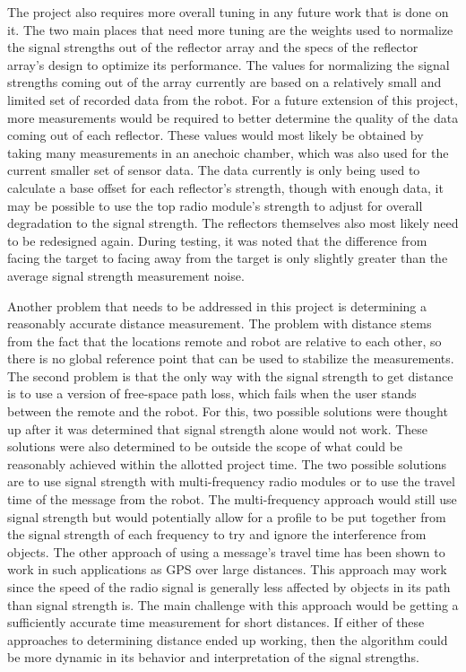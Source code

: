 \vspace*{12pt}
\noindent
The project also requires more overall tuning in any future work that is done on it. The two main places that need more tuning are the weights used to normalize the signal strengths out of the reflector array and the specs of the reflector array's design to optimize its performance. The values for normalizing the signal strengths coming out of the array currently are based on a relatively small and limited set of recorded data from the robot. For a future extension of this project, more measurements would be required to better determine the quality of the data coming out of each reflector. These values would most likely be obtained by taking many measurements in an anechoic chamber, which was also used for the current smaller set of sensor data. The data currently is only being used to calculate a base offset for each reflector's strength, though with enough data, it may be possible to use the top radio module's strength to adjust for overall degradation to the signal strength. The reflectors themselves also most likely need to be redesigned again. During testing, it was noted that the difference from facing the target to facing away from the target is only slightly greater than the average signal strength measurement noise.

\vspace*{12pt}
\noindent
Another problem that needs to be addressed in this project is determining a reasonably accurate distance measurement. The problem with distance stems from the fact that the locations remote and robot are relative to each other, so there is no global reference point that can be used to stabilize the measurements. The second problem is that the only way with the signal strength to get distance is to use a version of free-space path loss, which fails when the user stands between the remote and the robot. For this, two possible solutions were thought up after it was determined that signal strength alone would not work. These solutions were also determined to be outside the scope of what could be reasonably achieved within the allotted project time. The two possible solutions are to use signal strength with multi-frequency radio modules or to use the travel time of the message from the robot. The multi-frequency approach would still use signal strength but would potentially allow for a profile to be put together from the signal strength of each frequency to try and ignore the interference from objects. The other approach of using a message's travel time has been shown to work in such applications as GPS over large distances. This approach may work since the speed of the radio signal is generally less affected by objects in its path than signal strength is. The main challenge with this approach would be getting a sufficiently accurate time measurement for short distances. If either of these approaches to determining distance ended up working, then the algorithm could be more dynamic in its behavior and interpretation of the signal strengths.


